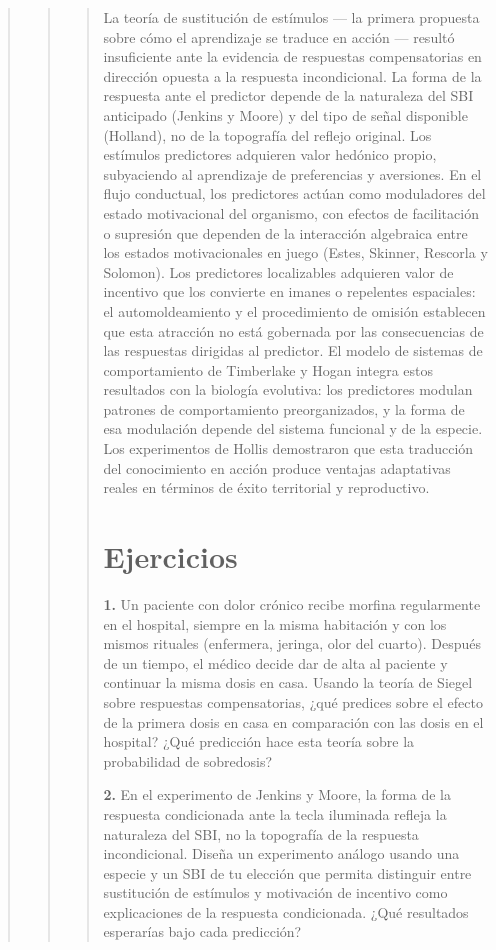 \documentclass[
  letterpaper,
  DIV=11,
  numbers=noendperiod]{scrreprt}
\begin{document}
\begin{tcolorbox}[enhanced jigsaw, toprule=.15mm, arc=.35mm, colback=white, opacityback=0, colframe=quarto-callout-note-color-frame, breakable, rightrule=.15mm, left=2mm, leftrule=.75mm, bottomrule=.15mm]
\begin{quote}
\begin{quote}
\begin{quote}
La teoría de sustitución de estímulos --- la primera propuesta sobre
cómo el aprendizaje se traduce en acción --- resultó insuficiente ante
la evidencia de respuestas compensatorias en dirección opuesta a la
respuesta incondicional. La forma de la respuesta ante el predictor
depende de la naturaleza del SBI anticipado (Jenkins y Moore) y del tipo
de señal disponible (Holland), no de la topografía del reflejo original.
Los estímulos predictores adquieren valor hedónico propio, subyaciendo
al aprendizaje de preferencias y aversiones. En el flujo conductual, los
predictores actúan como moduladores del estado motivacional del
organismo, con efectos de facilitación o supresión que dependen de la
interacción algebraica entre los estados motivacionales en juego (Estes,
Skinner, Rescorla y Solomon). Los predictores localizables adquieren
valor de incentivo que los convierte en imanes o repelentes espaciales:
el automoldeamiento y el procedimiento de omisión establecen que esta
atracción no está gobernada por las consecuencias de las respuestas
dirigidas al predictor. El modelo de sistemas de comportamiento de
Timberlake y Hogan integra estos resultados con la biología evolutiva:
los predictores modulan patrones de comportamiento preorganizados, y la
forma de esa modulación depende del sistema funcional y de la especie.
Los experimentos de Hollis demostraron que esta traducción del
conocimiento en acción produce ventajas adaptativas reales en términos
de éxito territorial y reproductivo.

\section{Ejercicios}\label{ejercicios-4}

\textbf{1.} Un paciente con dolor crónico recibe morfina regularmente en
el hospital, siempre en la misma habitación y con los mismos rituales
(enfermera, jeringa, olor del cuarto). Después de un tiempo, el médico
decide dar de alta al paciente y continuar la misma dosis en casa.
Usando la teoría de Siegel sobre respuestas compensatorias, ¿qué
predices sobre el efecto de la primera dosis en casa en comparación con
las dosis en el hospital? ¿Qué predicción hace esta teoría sobre la
probabilidad de sobredosis?

\textbf{2.} En el experimento de Jenkins y Moore, la forma de la
respuesta condicionada ante la tecla iluminada refleja la naturaleza del
SBI, no la topografía de la respuesta incondicional. Diseña un
experimento análogo usando una especie y un SBI de tu elección que
permita distinguir entre sustitución de estímulos y motivación de
incentivo como explicaciones de la respuesta condicionada. ¿Qué
resultados esperarías bajo cada predicción?


\end{quote}
\end{quote}
\end{quote}
\end{tcolorbox}
\end{document}

